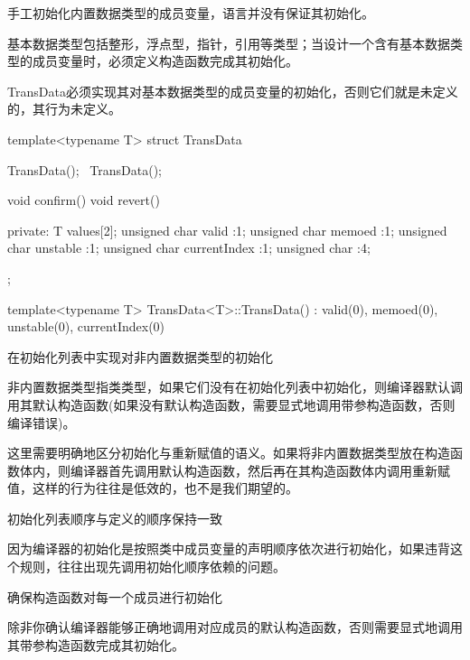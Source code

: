 \begin{content}
\begin{regulation}
手工初始化内置数据类型的成员变量，语言并没有保证其初始化。
\end{regulation}

基本数据类型包括整形，浮点型，指针，引用等类型；当设计一个含有基本数据类型的成员变量时，必须定义构造函数完成其初始化。

TransData必须实现其对基本数据类型的成员变量的初始化，否则它们就是未定义的，其行为未定义。

\begin{leftbar}
\begin{c++}
template<typename T>
struct TransData
{
   TransData();
   ~TransData();

   void confirm()
   void revert()

private:
   T values[2];
   unsigned char valid :1;
   unsigned char memoed :1;
   unsigned char unstable :1;
   unsigned char currentIndex :1;
   unsigned char :4;
};

template<typename T>
TransData<T>::TransData() : valid(0), memoed(0), unstable(0), currentIndex(0)
{
}
\end{c++}
\end{leftbar}

\begin{regulation}
在初始化列表中实现对非内置数据类型的初始化
\end{regulation}

非内置数据类型指类类型，如果它们没有在初始化列表中初始化，则编译器默认调用其默认构造函数(如果没有默认构造函数，需要显式地调用带参构造函数，否则编译错误)。

这里需要明确地区分初始化与重新赋值的语义。如果将非内置数据类型放在构造函数体内，则编译器首先调用默认构造函数，然后再在其构造函数体内调用重新赋值，这样的行为往往是低效的，也不是我们期望的。

\begin{regulation}
初始化列表顺序与定义的顺序保持一致
\end{regulation}

因为编译器的初始化是按照类中成员变量的声明顺序依次进行初始化，如果违背这个规则，往往出现先调用初始化顺序依赖的问题。

\begin{regulation}
确保构造函数对每一个成员进行初始化
\end{regulation}

除非你确认编译器能够正确地调用对应成员的默认构造函数，否则需要显式地调用其带参构造函数完成其初始化。


\end{content}
